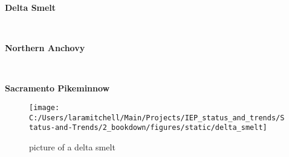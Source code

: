 \documentclass[
]{book}
\begin{document}
\begin{panel-grid}

\begin{columns-nocenter}

\begin{column800}

\textbf{Delta Smelt}

\end{column800}

\begin{column40}

~

\end{column40}

\begin{column800}

\textbf{Northern Anchovy}

\end{column800}

\begin{column40}

~

\end{column40}

\begin{column800}

\textbf{Sacramento Pikeminnow}

\end{column800}

\end{columns-nocenter}

\begin{columns-nocenter}

\begin{column800}

\begin{figure}

{\centering \texttt{[image: C:/Users/laramitchell/Main/Projects/IEP\_status\_and\_trends/Status-and-Trends/2\_bookdown/figures/static/delta\_smelt]} 

}

\caption{picture of a delta smelt}\label{fig:unnamed-chunk-76}
\end{figure}

\end{column800}

\begin{column40}

~

\end{column40}


\end{columns-nocenter}
\end{panel-grid}
\end{document}
